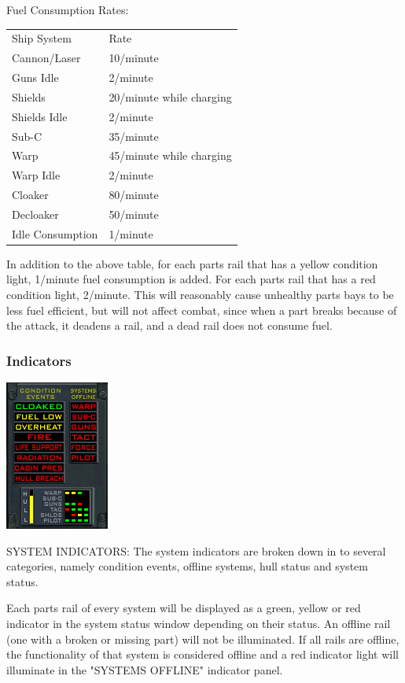 \begin{itemize}
Fuel Consumption Rates:

\begin{tabular}{ | l | l | }
\hline
Ship System & Rate \\
Cannon\slash Laser & 10\slash minute \\
Guns Idle & 2\slash minute \\
Shields & 20\slash minute while charging \\
Shields Idle & 2\slash minute \\
Sub-C & 35\slash minute \\
Warp & 45\slash minute while charging \\
Warp Idle & 2\slash minute \\
Cloaker & 80\slash minute \\
Decloaker & 50\slash minute \\
Idle Consumption & 1\slash minute \\
\hline
\end{tabular}

In addition to the above table, for each parts rail that has a yellow condition light, 1\slash minute fuel consumption is added. For each parts rail that has a red condition light, 2\slash minute.  This will reasonably cause unhealthy parts bays to be less fuel efficient, but will not affect combat, since when a part breaks because of the attack, it deadens a rail, and a dead rail does not consume fuel. 


\subsubsection{Indicators}
\includegraphics[scale=0.70]{images/indicators.png}

SYSTEM INDICATORS: 
The system indicators are broken down in to several categories, namely
condition events, offline systems, hull status and system status.

Each parts rail of every system will be displayed as a green, yellow or red
indicator in the system status window depending on their status.  An
offline rail (one with a broken or missing part) will not be illuminated.
If all rails are offline, the functionality of that system is considered
offline and a red indicator light will illuminate in the "SYSTEMS OFFLINE"
indicator panel.


\end{itemize}
